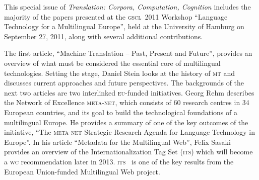 \documentclass[output=paper]{LSP/langsci}
\begin{document}
This special issue of \emph{Translation: Corpora, Computation,
  Cognition} includes the majority of the papers presented at the \textsc{gscl}~2011
Workshop ``Language Technology for a Multilingual Europe'', held at
the University of Hamburg on September 27, 2011, along with several
additional contributions.

The first article, ``Machine Translation -- Past, Present and
Future'', provides an overview of what must be considered the
essential core of multilingual technologies. Setting the stage, Daniel
Stein looks at the history of \textsc{mt} and discusses current approaches and
future perspectives. The backgrounds of the next two articles are two
interlinked \textsc{eu}-funded initiatives. Georg Rehm describes the Network of
Excellence \textsc{meta-net}, which consists of 60 research centres in 34
European countries, and its goal to build the technological
foundations of a multilingual Europe. He provides a summary of one of
the key outcomes of the initiative, ``The \textsc{meta-net} Strategic Research
Agenda for Language Technology in Europe''. In his article ``Metadata
for the Multilingual Web'', Felix Sasaki provides an overview of the
Internationalization Tag Set (\textsc{its}) which will become a \textsc{wc}
recommendation later in 2013. \textsc{its}~ is one of the key results from
the European Union-funded Multilingual Web project.
\end{document}
